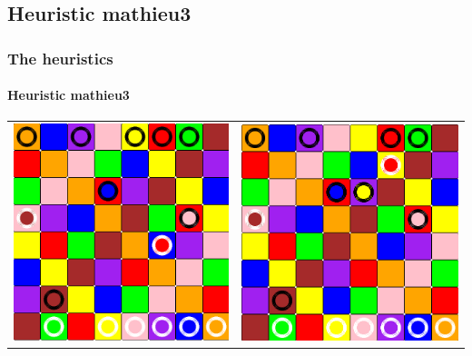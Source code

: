 \documentclass[a4paper, 11pt]{beamer}
\begin{document}
\subsection{Heuristic mathieu3}
\begin{frame}
 \frametitle{The heuristics}
 \framesubtitle{Heuristic mathieu3}
 \begin{table}[htbp]
  \centering
  \begin{tabular}{c c}
    \includegraphics[scale = 0.11]{mathieu3_1.png} & \includegraphics[scale = 0.11]{mathieu3_2.png} \\

\end{tabular}
\end{table}
\end{frame}
\end{document}
